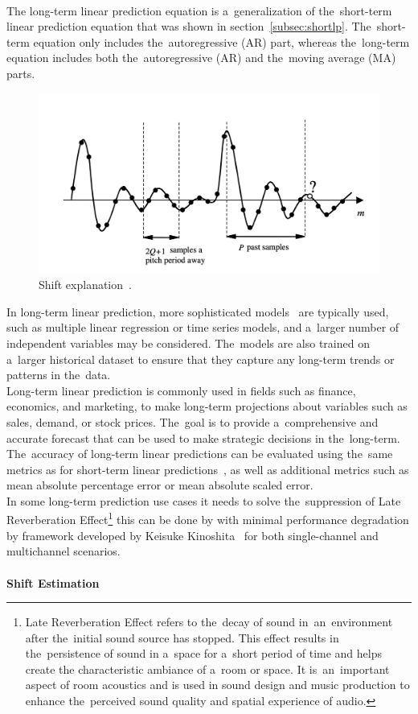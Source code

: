 \\
The long-term linear prediction equation is a~generalization of the~short-term linear prediction equation that was shown in section~\ref{subsec:shortlp}. The~short-term equation only includes the~autoregressive (AR) part, whereas the~long-term equation includes both the~autoregressive (AR) and the~moving average (MA) parts.
\begin{center}
    \begin{figure}[!ht]
        \centering
        \includegraphics[width=1\textwidth]{figures/shift}
        \caption{Shift explanation~\cite{vaseghi2008advanced}.}
        \label{fig:shiftExplain}
    \end{figure}
\end{center}

In long-term linear prediction, more sophisticated models~\cite{Nave} are typically used, such as multiple linear
regression or time series models, and a~larger number of independent variables may be considered. The~models are also
trained on a~larger historical dataset to ensure that they capture any long-term trends or patterns in the~data.
\\
Long-term linear prediction is commonly used in fields such as finance, economics, and marketing, to make long-term
projections about variables such as sales, demand, or stock prices. The~goal is to provide a~comprehensive and accurate
forecast that can be used to make strategic decisions in the~long-term. The~accuracy of long-term linear predictions
can be evaluated using the~same metrics as for short-term linear predictions~\cite{Baker}, as well as additional metrics
such as mean absolute percentage error or mean absolute scaled error.
\\
In some long-term prediction use cases it needs to solve the~suppression of Late Reverberation
Effect\footnote{Late Reverberation Effect refers to the~decay of sound in~an~environment after the~initial sound source
has stopped. This effect results in the~persistence of sound in a~space for a~short period of time and helps create the
characteristic ambiance of a~room or space. It is~an~important aspect of room acoustics and is used in sound
design and music production to enhance the~perceived sound quality and spatial experience of audio.} this can be done
by with minimal performance degradation by framework developed by Keisuke Kinoshita~\cite{Kinoshita} for both
single-channel and multichannel scenarios.\\
\\
\textbf{Shift Estimation}\\

